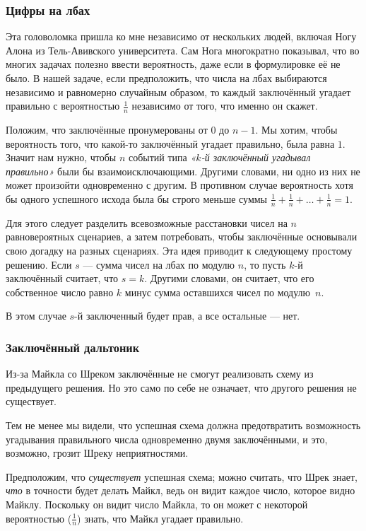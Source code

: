 \subsubsection*{Цифры на лбах}

Эта головоломка пришла ко мне независимо от нескольких людей, включая Ногу Алона из Тель-Авивского университета.
Сам Нога многократно показывал, что во многих задачах полезно ввести вероятность, даже если в формулировке её не было.
В нашей задаче, если предположить, что числа на лбах выбираются независимо и равномерно случайным образом, то каждый заключённый угадает правильно с вероятностью $\tfrac{1}{n}$ независимо от того, что именно он скажет.

Положим, что заключённые пронумерованы от $0$ до $n-1$.
Мы хотим, чтобы вероятность того, что какой-то заключённый угадает правильно, была равна $1$.
Значит нам нужно, чтобы $n$ событий типа \emph{«$k$-й заключённый угадывал правильно»} были бы взаимоисключающими.
Другими словами, ни одно из них не может произойти одновременно с другим.
В противном случае вероятность хотя бы одного успешного исхода была бы строго меньше суммы $\tfrac1n + \tfrac1n + \dots + \tfrac1n = 1$.

Для этого следует разделить всевозможные расстановки чисел на $n$ равновероятных сценариев, а затем потребовать, чтобы заключённые основывали свою догадку на разных сценариях.
Эта идея приводит к следующему простому решению.
Если $s$ --- сумма чисел на лбах по модулю $n$, то пусть $k$-й заключённый считает, что $s = k$.
Другими словами, он считает, что его собственное число равно $k$ минус сумма оставшихся чисел по модулю~$n$.

В этом случае $s$-й заключенный будет прав, а все остальные --- нет.

\subsubsection*{Заключённый дальтоник}

Из-за Майкла со Шреком заключённые не смогут реализовать схему из предыдущего решения.
Но это само по себе не означает, что другого решения не существует.

Тем не менее мы видели, что успешная схема должна предотвратить возможность угадывания правильного числа одновременно двумя заключёнными, и это, возможно, грозит Шреку неприятностями.

Предположим, что \emph{существует} успешная схема; можно считать, что Шрек знает,  \emph{что} в точности будет делать Майкл,
ведь он видит каждое число, которое видно Майклу.
Поскольку он видит число Майкла, то он может с некоторой вероятностью ($\tfrac1n$) знать, что Майкл угадает правильно.

